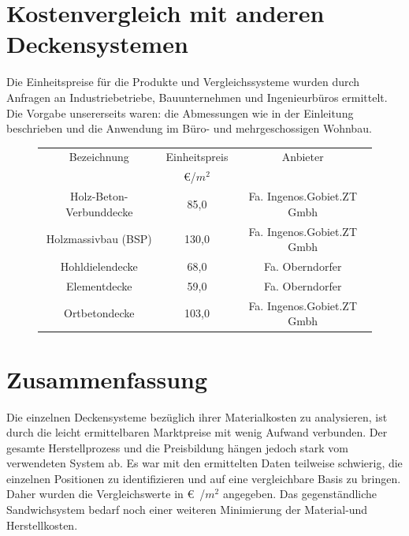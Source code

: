 \section{Kostenvergleich mit anderen Deckensystemen}

Die Einheitspreise für die Produkte und Vergleichssysteme wurden durch Anfragen an Industriebetriebe, Bauunternehmen und Ingenieurbüros ermittelt. Die Vorgabe unsererseits waren: die Abmessungen wie in der Einleitung beschrieben und die Anwendung im Büro- und mehrgeschossigen Wohnbau.

\begin{figure}[h!]
\begin{center}
\begin{tabular}{|c|c|c|}
\hline 
Bezeichnung & Einheitspreis & Anbieter \\ 
 & \euro/$m^{2}$& \\ 
\hline 
Holz-Beton-Verbunddecke & 85,0 & Fa. Ingenos.Gobiet.ZT Gmbh\\ 
\hline 
Holzmassivbau (BSP) & 130,0& Fa. Ingenos.Gobiet.ZT Gmbh\\ 
\hline 
Hohldielendecke & 68,0 &Fa. Oberndorfer\\ 
\hline 
Elementdecke & 59,0& Fa. Oberndorfer\\ 
\hline 
Ortbetondecke & 103,0 & Fa. Ingenos.Gobiet.ZT Gmbh\\ 
\hline 
\end{tabular} 
\end{center}
\end{figure}

\section{Zusammenfassung}

Die einzelnen Deckensysteme bezüglich ihrer Materialkosten zu analysieren, ist durch die leicht ermittelbaren Marktpreise mit wenig Aufwand verbunden. Der gesamte Herstellprozess und die Preisbildung hängen jedoch stark vom verwendeten System ab. Es war mit den  ermittelten Daten teilweise schwierig, die einzelnen Positionen zu identifizieren und auf eine vergleichbare Basis zu bringen. Daher wurden die Vergleichswerte in \euro\, /$m^{2}$ angegeben. Das gegenständliche Sandwichsystem bedarf noch einer weiteren Minimierung der Material-und Herstellkosten.



